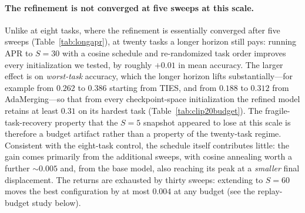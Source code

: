 \documentclass[11pt]{article}
\begin{document}
\paragraph{The refinement is not converged at five sweeps at this scale.}
Unlike at eight tasks, where the refinement is essentially converged after five sweeps (Table~\ref{tab:longapr}), at twenty tasks a longer horizon still pays: running APR to $S=30$ with a cosine schedule and re-randomized task order improves every initialization we tested, by roughly $+0.01$ in mean accuracy. The larger effect is on \emph{worst-task} accuracy, which the longer horizon lifts substantially---for example from $0.262$ to $0.386$ starting from TIES, and from $0.188$ to $0.312$ from AdaMerging---so that from every checkpoint-space initialization the refined model retains at least $0.31$ on its hardest task (Table~\ref{tab:clip20budget}). The fragile-task-recovery property that the $S=5$ snapshot appeared to lose at this scale is therefore a budget artifact rather than a property of the twenty-task regime. Consistent with the eight-task control, the schedule itself contributes little: the gain comes primarily from the additional sweeps, with cosine annealing worth a further $\sim\!0.005$ and, from the base model, also reaching its peak at a \emph{smaller} final displacement. The returns are exhausted by thirty sweeps: extending to $S=60$ moves the best configuration by at most $0.004$ at any budget (see the replay-budget study below).
\end{document}
